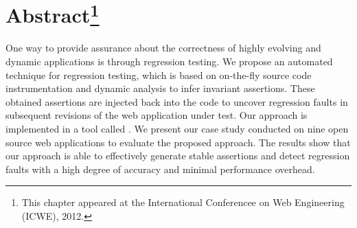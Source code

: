 \section*{Abstract\footnote{This chapter appeared at the International Conferencee on Web Engineering (ICWE), 2012.}}
One way to provide assurance about the correctness of highly evolving and dynamic applications is through regression testing. We propose an automated technique for \javascript regression testing, which is based on on-the-fly \javascript source code instrumentation and dynamic analysis to infer invariant assertions. These obtained assertions are injected back into the \javascript code to uncover regression faults in subsequent revisions of the web application under test.
Our approach is implemented in a tool called \jsart. We present our case study conducted on nine open source web applications to evaluate the proposed approach. The results show that our approach is able to effectively generate stable assertions and detect \javascript regression faults with a high degree of accuracy and minimal performance overhead.


